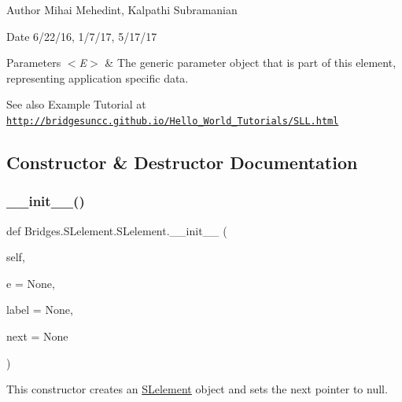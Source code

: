 \begin{DoxyAuthor}{Author}
Mihai Mehedint, Kalpathi Subramanian
\end{DoxyAuthor}
\begin{DoxyDate}{Date}
6/22/16, 1/7/17, 5/17/17
\end{DoxyDate}

\begin{DoxyParams}{Parameters}
{\em $<$\+E$>$} & The generic parameter object that is part of this element, representing application specific data.\\
\hline
\end{DoxyParams}
\begin{DoxySeeAlso}{See also}
Example Tutorial at ~\newline
 \href{http://bridgesuncc.github.io/Hello_World_Tutorials/SLL.html}{\tt http\+://bridgesuncc.\+github.\+io/\+Hello\+\_\+\+World\+\_\+\+Tutorials/\+S\+L\+L.\+html} 
\end{DoxySeeAlso}


\subsection{Constructor \& Destructor Documentation}
\mbox{\label{class_bridges_1_1_s_lelement_1_1_s_lelement_a650ebc16d0b6c365c0f729fd539c6d23}} 
\subsubsection{\texorpdfstring{\+\_\+\+\_\+init\+\_\+\+\_\+()}{\_\_init\_\_()}}
{\footnotesize\ttfamily def Bridges.\+S\+Lelement.\+S\+Lelement.\+\_\+\+\_\+init\+\_\+\+\_\+ (\begin{DoxyParamCaption}\item[{}]{self,  }\item[{}]{e = {\ttfamily None},  }\item[{}]{label = {\ttfamily None},  }\item[{}]{next = {\ttfamily None} }\end{DoxyParamCaption})}



This constructor creates an \mbox{\hyperlink{class_bridges_1_1_s_lelement_1_1_s_lelement}{S\+Lelement}} object and sets the next pointer to null. 



